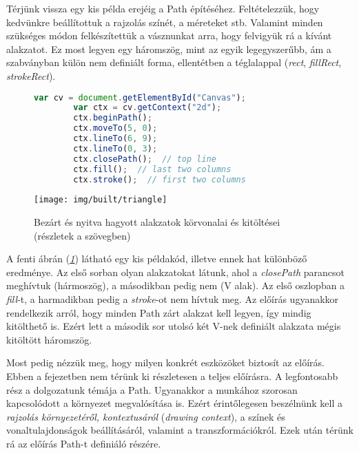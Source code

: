 \documentclass[12pt]{report}
\theoremstyle{definition}
\newcommand{\inenglish}[1]{\textsl{#1}}
\newcommand{\func}[1]{{\textsl{#1}}}
\begin{document}
Térjünk vissza egy kis példa erejéig a Path építéséhez. Feltételezzük, hogy
kedvünkre beállítottuk a rajzolás színét, a méreteket stb. Valamint minden
szükséges módon felkészítettük a vásznunkat arra, hogy felvigyük rá a kívánt
alakzatot. Ez most legyen egy háromszög, mint az egyik legegyszerűbb, ám a
szabványban külön nem definiált forma, ellentétben a téglalappal (\emph{rect},
\emph{fillRect}, \emph{strokeRect}).

  \begin{figure}[!htb]
    \hspace{0.1\textwidth}
      \centering
      \begin{lstlisting}[language=JavaScript, autogobble=true]
        var cv = document.getElementById("Canvas");
        var ctx = cv.getContext("2d");
        ctx.beginPath();
        ctx.moveTo(5, 0);
        ctx.lineTo(6, 9);
        ctx.lineTo(0, 3);
        ctx.closePath();  // top line
        ctx.fill();  // last two columns
        ctx.stroke();  // first two columns
      \end{lstlisting}
    \endminipage
    \hfill
      \texttt{[image: img/built/triangle]}
    \endminipage
    \caption{\label{fig:triangles} Bezárt és nyitva hagyott
    alakzatok körvonalai és kitöltései \\ (részletek a szövegben)}
  \end{figure}

A fenti ábrán (\emph{\ref{fig:triangles}}) látható egy kis példakód,
illetve ennek hat különböző eredménye. Az első sorban olyan alakzatokat látunk,
ahol a \func{closePath} parancsot meghívtuk (hármoszög), a másodikban pedig nem
(V alak). Az első oszlopban a \func{fill}-t, a harmadikban pedig a
\func{stroke}-ot nem hívtuk meg. Az előírás ugyanakkor rendelkezik arról, hogy
minden Path zárt alakzat kell legyen, így mindig kitölthető is. Ezért lett a
második sor utolsó két V-nek definiált alakzata mégis kitöltött háromszög.

Most pedig nézzük meg, hogy milyen konkrét eszközöket biztosít az előírás.
Ebben a fejezetben nem térünk ki részletesen a teljes előírásra. A legfontosabb
rész a dolgozatunk témája a Path. Ugyanakkor a munkához szorosan kapcsolódott a
környezet megvalósítása is. Ezért érintőlegesen beszélnünk kell a
\emph{rajzolás környezetéről, kontextusáról} (\inenglish{drawing context}), a
színek és vonaltulajdonságok beállításáról, valamint a transzformációkról. Ezek
után térünk rá az előírás Path-t definiáló részére.
\end{document}

